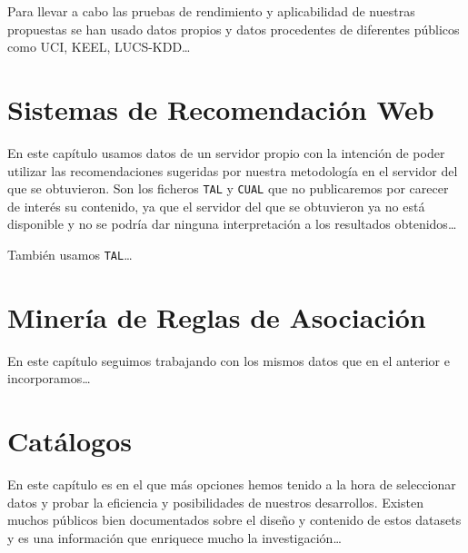 Para llevar a cabo las pruebas de rendimiento y aplicabilidad de nuestras propuestas se han usado datos propios y datos procedentes de diferentes \datasets públicos como UCI, KEEL, LUCS-KDD\ldots





\section{Sistemas de Recomendación Web}
En este capítulo usamos datos de un servidor propio con la intención de poder utilizar las recomendaciones sugeridas por nuestra metodología en el servidor del que se obtuvieron. Son los ficheros \texttt{TAL} y \texttt{CUAL} que no publicaremos por carecer de interés su contenido, ya que el servidor del que se obtuvieron ya no está disponible y no se podría dar ninguna interpretación a los resultados obtenidos\ldots

También usamos \texttt{TAL}\ldots




\section{Minería de Reglas de Asociación}
En este capítulo seguimos trabajando con los mismos datos que en el anterior e incorporamos\ldots




\section{Catálogos}
En este capítulo es en el que más opciones hemos tenido a la hora de seleccionar datos y probar la eficiencia y posibilidades de nuestros desarrollos. Existen muchos \datasets públicos bien documentados sobre el diseño y contenido de estos datasets y es una información que enriquece mucho la investigación\ldots




